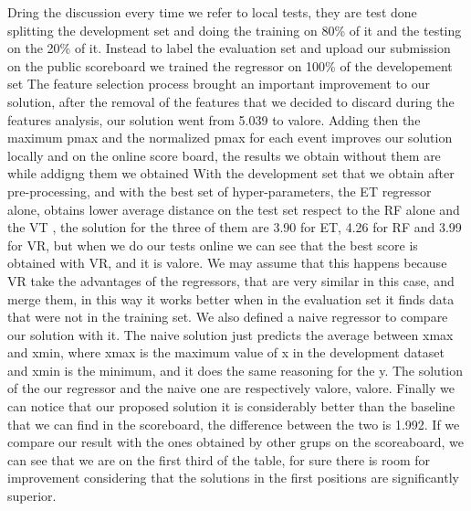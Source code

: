 \documentclass[conference]{IEEEtran}
\begin{document}
Dring the discussion every time we refer to local tests, they are test done splitting the development set and doing the training on 80\% of it and the testing on the 20\% of it. Instead to label the evaluation set and upload our submission on the public scoreboard we trained the regressor on 100\% of the developement set
The feature selection process brought an important improvement to our solution, after the removal of the features that we decided to discard during the features analysis,
our solution went from 5.039 to valore.
Adding then the maximum pmax and the normalized pmax for each event improves our solution locally and on the online score board, the results we obtain without them are
while addigng them we obtained %
With the development set that we obtain after pre-processing, and with the best set of hyper-parameters, the ET regressor alone, obtains lower average distance on the test set respect to the RF alone and the VT , the solution for the three of them are 3.90 for ET, 4.26 for RF and 3.99 for VR,
but when we do our tests online we can see that the best score is obtained with VR, and it is valore. We may assume that this happens because VR take the advantages of the regressors, that are very similar in this case, and merge them, in this way it works better when in the evaluation set it finds data that were not in the training set.
We also defined a naive regressor to compare our solution with it. The naive solution just predicts the average between xmax and xmin, where xmax is the maximum value of x in the development dataset and xmin is the minimum, and it does the same reasoning for the y.
The solution of the our regressor and the naive one are respectively valore, valore.
Finally we can notice that our proposed solution it is considerably better than the baseline that we can find in the scoreboard, the difference between the two is 1.992.
If we compare our result with the ones obtained by other grups on the scoreaboard, we can see that we are on the first third of the table, for sure there is room for improvement considering that the solutions in the first positions are significantly superior.
\end{document}
